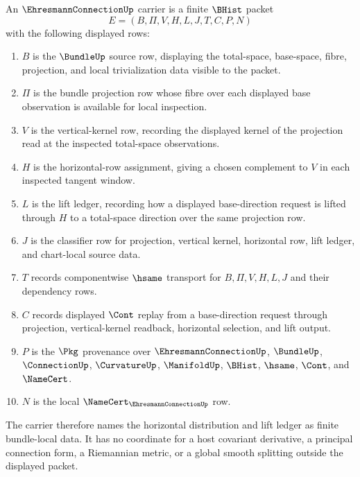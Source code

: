\begin{definition}
\label{def:ehresmann-connection-carrier}
An $\EhresmannConnectionUp$ carrier is a finite $\BHist$ packet
$$
E=(B,\Pi,V,H,L,J,T,C,P,N)
$$
with the following displayed rows:
\begin{enumerate}
\item $B$ is the $\BundleUp$ source row, displaying the total-space, base-space, fibre, projection, and local trivialization data visible to the packet.
\item $\Pi$ is the bundle projection row whose fibre over each displayed base observation is available for local inspection.
\item $V$ is the vertical-kernel row, recording the displayed kernel of the projection read at the inspected total-space observations.
\item $H$ is the horizontal-row assignment, giving a chosen complement to $V$ in each inspected tangent window.
\item $L$ is the lift ledger, recording how a displayed base-direction request is lifted through $H$ to a total-space direction over the same projection row.
\item $J$ is the classifier row for projection, vertical kernel, horizontal row, lift ledger, and chart-local source data.
\item $T$ records componentwise $\hsame$ transport for $B,\Pi,V,H,L,J$ and their dependency rows.
\item $C$ records displayed $\Cont$ replay from a base-direction request through projection, vertical-kernel readback, horizontal selection, and lift output.
\item $P$ is the $\Pkg$ provenance over $\EhresmannConnectionUp$, $\BundleUp$, $\ConnectionUp$, $\CurvatureUp$, $\ManifoldUp$, $\BHist$, $\hsame$, $\Cont$, and $\NameCert$.
\item $N$ is the local $\NameCert_{\EhresmannConnectionUp}$ row.
\end{enumerate}
The carrier therefore names the horizontal distribution and lift ledger as finite bundle-local data. It has no coordinate for a host covariant derivative, a principal connection form, a Riemannian metric, or a global smooth splitting outside the displayed packet.
\end{definition}

